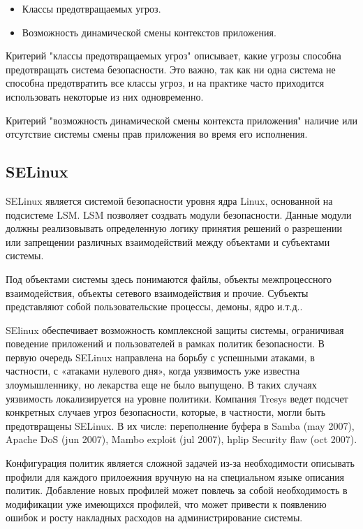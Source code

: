 \bigskip
\begin{itemize} 
\item 	Классы предотвращаемых угроз. 
\item 	Возможность динамической смены контекстов
		приложения. 
\end{itemize} 

\bigskip

Критерий "классы предотвращаемых угроз" 
описывает, какие угрозы способна 
предотвращать система безопасности. Это 
важно, так как ни одна система не способна 
предотвратить все классы угроз, и на практике 
часто приходится использовать некоторые из 
них одновременно. 

Критерий "возможность динамической смены 
контекста приложения" наличие или отсутствие 
системы смены прав приложения во время его исполнения. 

\bigskip
\subsection{SELinux} 
SELinux является системой безопасности 
уровня ядра Linux, основанной на 
подсистеме LSM. LSM позволяет 
создвать модули безопасности. Данные модули 
должны реализовывать 
определенную логику принятия решений о 
разрешении или запрещении различных 
взаимодействий между объектами и субъектами 
системы. 

Под объектами системы здесь 
понимаются файлы, объекты межпроцессного 
взаимодействия, объекты сетевого взаимодействия 
и прочие. Субъекты представляют собой 
пользовательские процессы, демоны, ядро и.т.д..

SElinux обеспечивает возможность 
комплексной защиты системы, ограничивая поведение 
приложений и пользователей в рамках политик 
безопасности. В первую очередь SELinux 
направлена на борьбу с успешными атаками, 
в частности, с «атаками нулевого дня», когда 
уязвимость уже известна злоумышленнику, 
но лекарства еще не было выпущено. В таких 
случаях уязвимость локализируется на уровне 
политики. Компания Tresys ведет подсчет 
конкретных случаев угроз безопасности, которые, 
в частности, могли быть предотвращены SELinux. 
В их числе: переполнение буфера в Samba (may 
2007), Apache DoS (jun 2007), Mambo exploit (jul 
2007), hplip Security flaw (oct 2007). 

Конфигурация политик является 
сложной задачей из-за необходимости
описывать профили для каждого прилоежния 
вручную на на специальном языке описания
политик. Добавление новых профилей может повлечь 
за собой необходимость в модификации уже имеющихся 
профилей, что может привести к появлению 
ошибок и росту накладных расходов на 
администрирование системы.  

